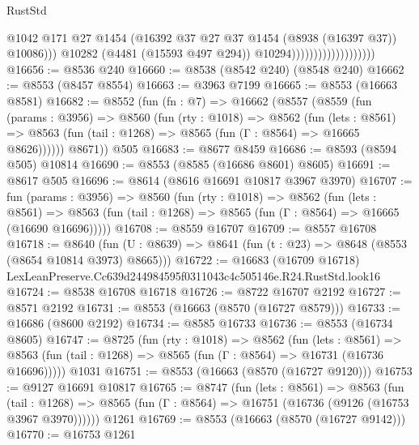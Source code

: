 \begin{lexlean}{RustStd}
\begin{coremodule}
                                              @1042
                                              @171
                                              @27
                                              @1454
                                              (@16392
                                                @37
                                                @27
                                                @37
                                                @1454
                                                (@8938 (@16397 @37))
                                                @10086)))
                                          @10282
                                          (@4481 (@15593 @497 @294))
                                          @10294)))))))))))))))))))
@16656 := @8536 @240
@16660 := @8538 (@8542 @240) (@8548 @240)
@16662 := @8553 (@8457 @8554)
@16663 := @3963 @7199
@16665 := @8553 (@16663 @8581)
@16682 := @8552
    (fun (fn : @7) =>
    @16662
      (@8557
        (@8559
          (fun (params : @3956) =>
          @8560
            (fun (rty : @1018) =>
            @8562
              (fun (lets : @8561) =>
              @8563 (fun (tail : @1268) => @8565 (fun (Γ : @8564) => @16665 @8626))))))
        @8671))
    @505
@16683 := @8677 @8459
@16686 := @8593 (@8594 @505) @10814
@16690 := @8553 (@8585 (@16686 @8601) @8605)
@16691 := @8617 @505
@16696 := @8614 (@8616 @16691 @10817 @3967 @3970)
@16707 := fun (params : @3956) =>
  @8560
    (fun (rty : @1018) =>
    @8562
      (fun (lets : @8561) =>
      @8563 (fun (tail : @1268) => @8565 (fun (Γ : @8564) => @16665 (@16690 @16696)))))
@16708 := @8559 @16707
@16709 := @8557 @16708
@16718 := @8640
    (fun (U : @8639) => @8641 (fun (t : @23) => @8648 (@8553 (@8654 @10814 @3973) @8665)))
@16722 := @16683
    (@16709 @16718)
    LexLeanPreserve.Cc639d244984595f0311043c4c505146e.R24.RustStd.look16
@16724 := @8538 @16708 @16718
@16726 := @8722 @16707 @2192
@16727 := @8571 @2192
@16731 := @8553 (@16663 (@8570 (@16727 @8579)))
@16733 := @16686 (@8600 @2192)
@16734 := @8585 @16733
@16736 := @8553 (@16734 @8605)
@16747 := @8725
    (fun (rty : @1018) =>
    @8562
      (fun (lets : @8561) =>
      @8563 (fun (tail : @1268) => @8565 (fun (Γ : @8564) => @16731 (@16736 @16696)))))
    @1031
@16751 := @8553 (@16663 (@8570 (@16727 @9120)))
@16753 := @9127 @16691 @10817
@16765 := @8747
    (fun (lets : @8561) =>
    @8563
      (fun (tail : @1268) =>
      @8565 (fun (Γ : @8564) => @16751 (@16736 (@9126 (@16753 @3967 @3970))))))
    @1261
@16769 := @8553 (@16663 (@8570 (@16727 @9142)))
@16770 := @16753 @1261

\end{coremodule}
\end{lexlean}
